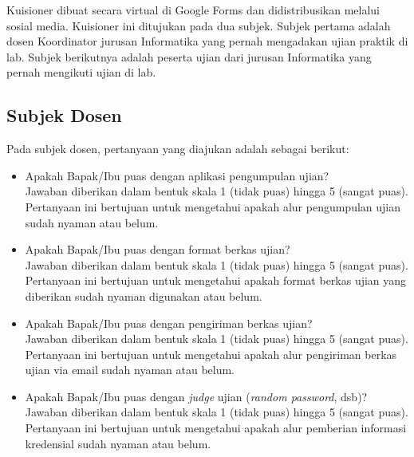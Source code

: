     Kuisioner dibuat secara virtual di Google Forms dan didistribusikan melalui
    sosial media. Kuisioner ini ditujukan pada dua subjek. Subjek pertama adalah
    dosen Koordinator jurusan Informatika yang pernah mengadakan ujian praktik
    di lab. Subjek berikutnya adalah peserta ujian dari jurusan Informatika yang
    pernah mengikuti ujian di lab. 
    
    \subsection{Subjek Dosen}
    Pada subjek dosen, pertanyaan yang diajukan adalah sebagai berikut:
    \begin{itemize}
        \item Apakah Bapak/Ibu puas dengan aplikasi pengumpulan ujian? \\
            Jawaban diberikan dalam bentuk skala 1 (tidak puas) hingga 5 (sangat
            puas). Pertanyaan ini bertujuan untuk mengetahui apakah alur
            pengumpulan ujian sudah nyaman atau belum.
            
        \item Apakah Bapak/Ibu puas dengan format berkas ujian? \\
            Jawaban diberikan dalam bentuk skala 1 (tidak puas) hingga 5 (sangat
            puas). Pertanyaan ini bertujuan untuk mengetahui apakah format
            berkas ujian yang diberikan sudah nyaman digunakan atau belum.
            
        \item Apakah Bapak/Ibu puas dengan pengiriman berkas ujian? \\
            Jawaban diberikan dalam bentuk skala 1 (tidak puas) hingga 5 (sangat
            puas). Pertanyaan ini bertujuan untuk mengetahui apakah alur
            pengiriman berkas ujian via email sudah nyaman atau belum.
            
        \item Apakah Bapak/Ibu puas dengan \textit{judge} ujian (\textit{random
        password}, dsb)? \\
            Jawaban diberikan dalam bentuk skala 1 (tidak puas) hingga 5 (sangat
            puas). Pertanyaan ini bertujuan untuk mengetahui apakah alur
            pemberian informasi kredensial sudah nyaman atau belum.
            

\end{itemize}
